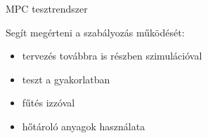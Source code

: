 \documentclass[14pt,handout]{beamer}
\begin{document}
\begin{frame}{MPC tesztrendszer}


Segít megérteni a szabályozás működését:
\begin{itemize}
	\item tervezés továbbra is részben szimulációval
	\item teszt a gyakorlatban
	\item fűtés izzóval
	\item hőtároló anyagok használata
\end{itemize}



\end{frame}
\end{document}
